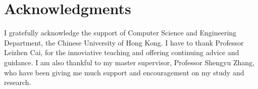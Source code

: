 \documentclass[11pt,letter]{article}
\begin{document}
\section{Acknowledgments}
I gratefully acknowledge the support of Computer Science and Engineering Department, the Chinese University of Hong Kong. I have to thank Professor Leizhen Cai, for the innoviative teaching and offering continuing advice and guidance. I am also thankful to my master supervisor, Professor Shengyu Zhang, who have been giving me much support and encouragement on my study and research.





\end{document}
